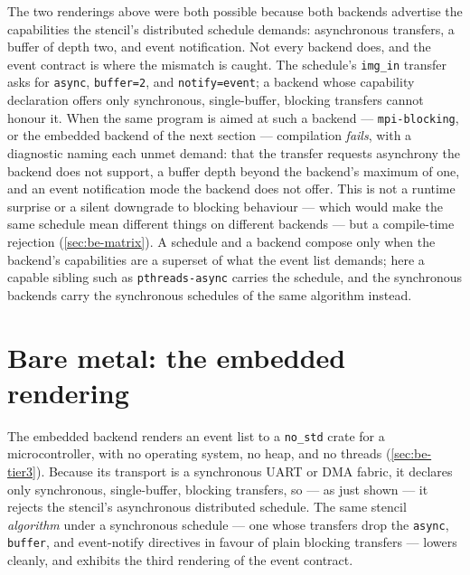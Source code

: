 The two renderings above were both possible because both backends advertise the
capabilities the stencil's distributed schedule demands: asynchronous transfers, a
buffer of depth two, and event notification. Not every backend does, and the event
contract is where the mismatch is caught. The schedule's \texttt{img\_in} transfer
asks for \texttt{async}, \texttt{buffer=2}, and \texttt{notify=event}; a backend
whose capability declaration offers only synchronous, single-buffer, blocking
transfers cannot honour it. When the same program is aimed at such a backend ---
\texttt{mpi-blocking}, or the embedded backend of the next section --- compilation
\emph{fails}, with a diagnostic naming each unmet demand: that the transfer requests
asynchrony the backend does not support, a buffer depth beyond the backend's maximum
of one, and an event notification mode the backend does not offer. This is not a
runtime surprise or a silent downgrade to blocking behaviour --- which would make the
same schedule mean different things on different backends --- but a compile-time
rejection (\cref{sec:be-matrix}). A schedule and a backend compose only when the
backend's capabilities are a superset of what the event list demands; here a capable
sibling such as \texttt{pthreads-async} carries the schedule, and the synchronous
backends carry the synchronous schedules of the same algorithm instead.

\section{Bare metal: the embedded rendering}\label{sec:wt-embedded}

The embedded backend renders an event list to a \texttt{no\_std} crate for a
microcontroller, with no operating system, no heap, and no threads
(\cref{sec:be-tier3}). Because its transport is a synchronous UART or DMA fabric, it
declares only synchronous, single-buffer, blocking transfers, so --- as just shown ---
it rejects the stencil's asynchronous distributed schedule. The same stencil
\emph{algorithm} under a synchronous schedule --- one whose transfers drop the
\texttt{async}, \texttt{buffer}, and event-notify directives in favour of plain
blocking transfers --- lowers cleanly, and exhibits the third rendering of the event
contract.

